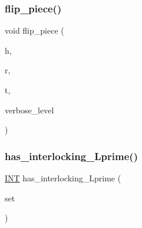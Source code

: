 \mbox{\label{pentomino__5x5_8_c_aba47de4ac2eea1209cb16f98625291aa}} 
\subsubsection{\texorpdfstring{flip\+\_\+piece()}{flip\_piece()}}
{\footnotesize\ttfamily void flip\+\_\+piece (\begin{DoxyParamCaption}\item[{\mbox{\hyperlink{galois_8h_a09fddde158a3a20bd2dcadb609de11dc}{I\+NT}} \&}]{h,  }\item[{\mbox{\hyperlink{galois_8h_a09fddde158a3a20bd2dcadb609de11dc}{I\+NT}} \&}]{r,  }\item[{\mbox{\hyperlink{galois_8h_a09fddde158a3a20bd2dcadb609de11dc}{I\+NT}} \&}]{t,  }\item[{\mbox{\hyperlink{galois_8h_a09fddde158a3a20bd2dcadb609de11dc}{I\+NT}}}]{verbose\+\_\+level }\end{DoxyParamCaption})}

\mbox{\label{pentomino__5x5_8_c_a028a855df15445ac70a5894fd68a1087}} 
\subsubsection{\texorpdfstring{has\+\_\+interlocking\+\_\+\+Lprime()}{has\_interlocking\_Lprime()}}
{\footnotesize\ttfamily \mbox{\hyperlink{galois_8h_a09fddde158a3a20bd2dcadb609de11dc}{I\+NT}} has\+\_\+interlocking\+\_\+\+Lprime (\begin{DoxyParamCaption}\item[{\mbox{\hyperlink{galois_8h_a09fddde158a3a20bd2dcadb609de11dc}{I\+NT}} $\ast$}]{set }\end{DoxyParamCaption})}

\mbox{\label{pentomino__5x5_8_c_a17a6f7af17f6599425b833c698ef4e23}} 
